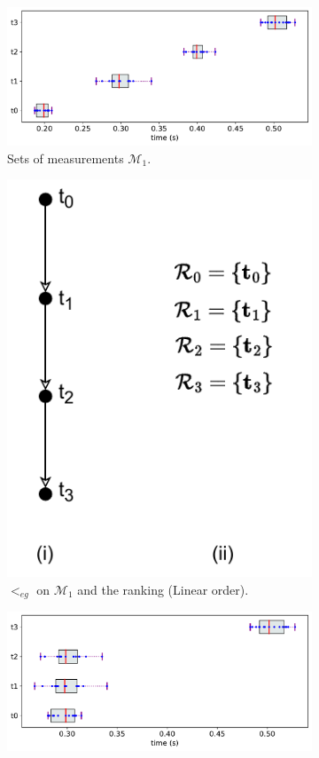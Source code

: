 \documentclass[acmsmall,screen, review]{acmart}
\begin{document}
\begin{figure}[h!]
	\centering
	\begin{subfigure}[b]{0.59\textwidth}
		\centering
		\includegraphics[width=1\linewidth]{fig/ch3/pr-def2-1}
		\caption{Sets of measurements $\mathcal{M}_1$.}
		\label{fig:total-eg}
	\end{subfigure}
	\begin{subfigure}[b]{0.39\textwidth}
		\centering
		\includegraphics[width=0.6\linewidth]{fig/ch3/pr-def-total.pdf}
		\caption{$<_{eg}$ on $\mathcal{M}_1$ and the ranking (Linear order).}
		\label{fig:total}
	\end{subfigure}
	\par\bigskip
	\begin{subfigure}[b]{0.59\textwidth}
		\includegraphics[width=1\linewidth]{fig/ch3/pr-def2-2}

\end{subfigure}
\end{figure}
\end{document}

